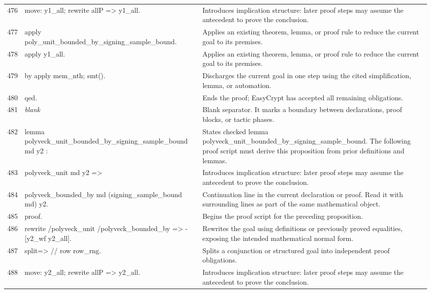 \documentclass[10pt]{article}
\begin{document}
\begin{longtable}{r L{0.53\textwidth} L{0.37\textwidth}}
476 & {\ttfamily\scriptsize move: y1\_all; rewrite allP => y1\_all.} & Introduces implication structure: later proof steps may assume the antecedent to prove the conclusion. \\
477 & {\ttfamily\scriptsize apply poly\_unit\_bounded\_by\_signing\_sample\_bound.} & Applies an existing theorem, lemma, or proof rule to reduce the current goal to its premises. \\
478 & {\ttfamily\scriptsize apply y1\_all.} & Applies an existing theorem, lemma, or proof rule to reduce the current goal to its premises. \\
479 & {\ttfamily\scriptsize by apply mem\_nth; smt().} & Discharges the current goal in one step using the cited simplification, lemma, or automation. \\
480 & {\ttfamily\scriptsize qed.} & Ends the proof; EasyCrypt has accepted all remaining obligations. \\
481 & {\ttfamily\scriptsize \emph{blank}} & Blank separator.  It marks a boundary between declarations, proof blocks, or tactic phases. \\
482 & {\ttfamily\scriptsize lemma polyveck\_unit\_bounded\_by\_signing\_sample\_bound md y2 :} & States checked lemma polyveck\_unit\_bounded\_by\_signing\_sample\_bound.  The following proof script must derive this proposition from prior definitions and lemmas. \\
483 & {\ttfamily\scriptsize   polyveck\_unit md y2 =>} & Introduces implication structure: later proof steps may assume the antecedent to prove the conclusion. \\
484 & {\ttfamily\scriptsize   polyveck\_bounded\_by md (signing\_sample\_bound md) y2.} & Continuation line in the current declaration or proof.  Read it with surrounding lines as part of the same mathematical object. \\
485 & {\ttfamily\scriptsize proof.} & Begins the proof script for the preceding proposition. \\
486 & {\ttfamily\scriptsize rewrite /polyveck\_unit /polyveck\_bounded\_by => -[y2\_wf y2\_all].} & Rewrites the goal using definitions or previously proved equalities, exposing the intended mathematical normal form. \\
487 & {\ttfamily\scriptsize split=> // row row\_rng.} & Splits a conjunction or structured goal into independent proof obligations. \\
488 & {\ttfamily\scriptsize move: y2\_all; rewrite allP => y2\_all.} & Introduces implication structure: later proof steps may assume the antecedent to prove the conclusion. \\

\end{longtable}
\end{document}
